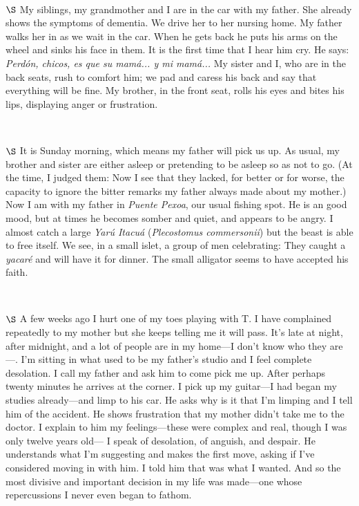 \documentclass[a4paper, 12pt]{article}
\begin{document}
~ 

$\S$ My siblings, my grandmother and I are in the car with my father. She
already shows the symptoms of dementia. We drive her to her nursing home. My
father walks her in as we wait in the car. When he gets back he puts his arms
on the wheel and sinks his face in them. It is the first time that I hear
him cry. He says: \textit{Perdón, chicos, es que su mamá... y mi mamá...} My
sister and I, who are in the back seats, rush to comfort him; we pad and caress
his back and say that everything will be fine. My brother, in the front seat,
rolls his eyes and bites his lips, displaying anger or frustration.

~

$\S$ It is Sunday morning, which means my father will pick us up. As usual, my
brother and sister are either asleep or pretending to be asleep so as not to
go. (At the time, I judged them: Now I see that they lacked, for better or for
worse, the capacity to ignore the bitter remarks my father always made
about my mother.) Now I am with my father in \textit{Puente Pexoa}, our usual
fishing spot. He is an good mood, but at times he becomes somber and quiet, and
appears to be angry. I almost catch a large \textit{Yarú Itacuá}
(\textit{Plecostomus commersonii}) but the beast is able to free itself. We
see, in a small islet, a group of men celebrating: They caught a
\textit{yacaré} and will have it for dinner. The small alligator seems to have
accepted his faith.

~ 

$\S$ A few weeks ago I hurt one of my toes playing with T. I have complained
repeatedly to my mother but she keeps telling me it will pass. It's late at
night, after midnight, and a lot of people are in my home---I don't know who
they are---. I'm sitting in what used to be my father's studio and I feel
complete desolation. I call my father and ask him to come pick me up. After
perhaps twenty minutes he arrives at the corner. I pick up
my guitar---I had began my studies already---and limp to his car. He asks why
is it that I'm limping and I tell him of the accident. He shows frustration
that my mother didn't take me to the doctor. I explain to him my
feelings---these were complex and real, though I was only twelve years old--- I
speak of desolation, of anguish, and despair. He understands what I'm
suggesting and makes the first move, asking if I've considered moving in with
him. I told him that was what I wanted. And so the most divisive and important
decision in my life was made---one whose repercussions I never even began to
fathom.
\end{document}
